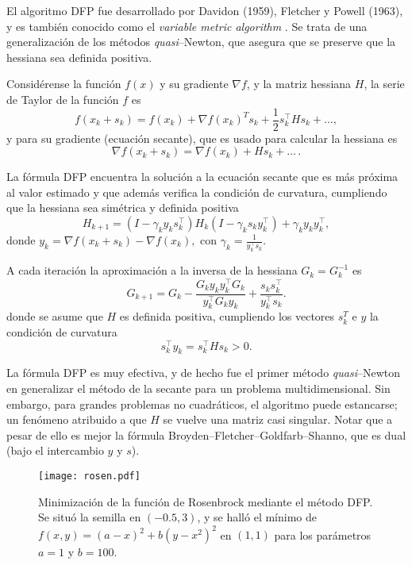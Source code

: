 El algoritmo DFP fue desarrollado por Davidon (1959), Fletcher y Powell (1963), y es también conocido como el \emph{variable metric algorithm} \cite{fletcher1963rapidly}. Se trata de una generalización de los métodos \textit{quasi}--Newton, que asegura que se preserve que la hessiana sea definida positiva.

Considérense la función $f(x)$ y su gradiente $\nabla f$, y la matriz hessiana $H$, la serie de Taylor de la función $f$ es \cite{fletcher2000practical}
\begin{equation}
  f(x_k+s_k) = f(x_k) + \nabla f(x_k)^T s_k + \frac{1}{2} s_k^{\top} {H} s_k + \dots,
\end{equation}
y para su gradiente (ecuación secante), que es usado para calcular la hessiana es
\[\nabla f(x_k+s_k) = \nabla f(x_k) + H s_k + \dots\,.\]
  

La fórmula DFP encuentra la solución a la ecuación secante que es más próxima al valor estimado y que además verifica la condición de curvatura, cumpliendo que la hessiana sea simétrica y definida positiva
\begin{equation}
  H_{k+1}=
(I - \gamma_k y_k s_k^{\top}) H_k (I - \gamma_k s_k y_k^{\top}) + \gamma_k y_k y_k^{\top},
\end{equation}
donde $y_k = \nabla f(x_k+s_k) - \nabla f(x_k),$ con 
$\gamma_k = \frac{1}{y_k^{\top} s_k}$.

A cada iteración la aproximación a la inversa de la hessiana $G_k = G_k^{-1}$ es
\begin{equation}
  G_{k+1} = G_k - \frac{G_k y_k y_k^{\top} G_k}{y_k^{\top} G_k y_k} + \frac{s_k s_k^{\top}}{y_k^{\top} s_k}.
\end{equation}
donde se asume que $H$ es definida positiva, cumpliendo los vectores  $s_k^T$ e $y$ la condición de curvatura
\begin{equation}
  s_k^{\top} y_k = s_k^{\top} H s_k > 0.
\end{equation}

La fórmula DFP es muy efectiva, y de hecho fue el primer método \textit{quasi}--Newton en generalizar el método de la secante para un problema multidimensional. Sin embargo, para grandes problemas no cuadráticos, el algoritmo puede estancarse; un fenómeno atribuido a que $H$ se vuelve una matriz casi singular. Notar que a pesar de ello es mejor la fórmula Broyden--Fletcher--Goldfarb--Shanno, que es dual (bajo el intercambio $y$ y $s$).



\begin{figure}[H]
  \centering
  \texttt{[image: rosen.pdf]}
  \caption{Minimización de la función de Rosenbrock mediante el método DFP. Se situó la semilla en $(-0.5,3)$, y se halló el mínimo de $f(x, y) = (a-x)^2 + b(y-x^2)^2$ en $(1,1)$ para los parámetros $a=1$ y $b=100$.}
\end{figure}




